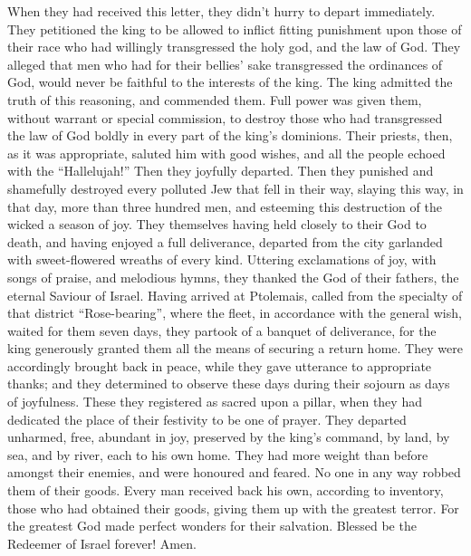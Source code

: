  When they had received this letter, they didn't hurry to
depart immediately. They petitioned the king to be allowed to inflict
fitting punishment upon those of their race who had willingly
transgressed the holy god, and the law of God.  They
alleged that men who had for their bellies' sake transgressed the
ordinances of God, would never be faithful to the interests of the king.
 The king admitted the truth of this reasoning, and
commended them. Full power was given them, without warrant or special
commission, to destroy those who had transgressed the law of God boldly
in every part of the king's dominions.  Their priests,
then, as it was appropriate, saluted him with good wishes, and all the
people echoed with the ``Hallelujah!'' Then they joyfully departed.
 Then they punished and shamefully destroyed every polluted
Jew that fell in their way,  slaying this way, in that day,
more than three hundred men, and esteeming this destruction of the
wicked a season of joy.  They themselves having held
closely to their God to death, and having enjoyed a full deliverance,
departed from the city garlanded with sweet-flowered wreaths of every
kind. Uttering exclamations of joy, with songs of praise, and melodious
hymns, they thanked the God of their fathers, the eternal Saviour of
Israel.  Having arrived at Ptolemais, called from the
specialty of that district ``Rose-bearing'', where the fleet, in
accordance with the general wish, waited for them seven days,
 they partook of a banquet of deliverance, for the king
generously granted them all the means of securing a return home.
 They were accordingly brought back in peace, while they
gave utterance to appropriate thanks; and they determined to observe
these days during their sojourn as days of joyfulness. 
These they registered as sacred upon a pillar, when they had dedicated
the place of their festivity to be one of prayer. They departed
unharmed, free, abundant in joy, preserved by the king's command, by
land, by sea, and by river, each to his own home.  They had
more weight than before amongst their enemies, and were honoured and
feared. No one in any way robbed them of their goods. 
Every man received back his own, according to inventory, those who had
obtained their goods, giving them up with the greatest terror. For the
greatest God made perfect wonders for their salvation. 
Blessed be the Redeemer of Israel forever! Amen.
